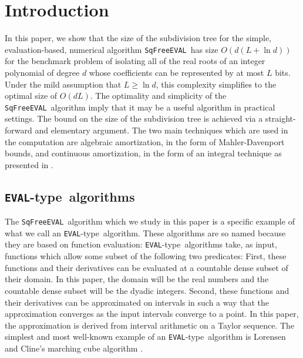 \documentclass{amsart}
\theoremstyle{definition}
\newcommand{\EVAL}{\texttt{SqFreeEVAL}}
\newcommand{\EVALTYPE}{\texttt{EVAL}-type}
\begin{document}
\section{Introduction}
In this paper, we show that the size of the subdivision tree for the simple, evaluation-based, numerical algorithm \EVAL\ has size $O(d(L+\ln d))$ for the benchmark problem of isolating all of the real roots of an integer polynomial of degree $d$ whose coefficients can be represented by at most $L$ bits.  Under the mild assumption that $L\geq\ln d$, this complexity simplifies to the optimal size of $O(dL)$.  The optimality and simplicity of the \EVAL\ algorithm imply that it may be a useful algorithm in practical settings.  The bound on the size of the subdivision tree is achieved via a straight-forward and elementary argument.  The two main techniques which are used in the computation are algebraic amortization, in the form of Mahler-Davenport bounds, and continuous amortization, in the form of an integral technique as presented in \citep{Burr-Krahmer-Yap:integral:09}.

\subsection{\EVALTYPE\ algorithms}
The \EVAL\ algorithm which we study in this paper is a specific example of what we call an \EVALTYPE\ algorithm.  These algorithms are so named because they are based on function evaluation: \EVALTYPE\ algorithms take, as input, functions which allow some subset of the following two predicates: First, these functions and their derivatives can be evaluated at a countable dense subset of their domain.  In this paper, the domain will be the real numbers and the countable dense subset will be the dyadic integers.  Second, these functions and their derivatives can be approximated on intervals in such a way that the approximation converges as the input intervals converge to a point.  In this paper, the approximation is derived from interval arithmetic on a Taylor sequence.  The simplest and most well-known example of an \EVALTYPE\ algorithm is Lorensen and Cline's marching cube algorithm \citep{marchingcube1987}.
\end{document}

